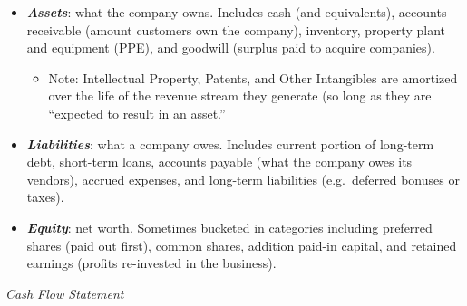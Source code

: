 \documentclass[
]{article}
\providecommand{\tightlist}{%
  \setlength{\itemsep}{0pt}\setlength{\parskip}{0pt}}
\begin{document}
\begin{itemize}
\item
  \textbf{\emph{Assets}}: what the company owns. Includes cash (and
  equivalents), accounts receivable (amount customers own the company),
  inventory, property plant and equipment (PPE), and goodwill (surplus
  paid to acquire companies).

  \begin{itemize}
  \tightlist
  \item
    Note: Intellectual Property, Patents, and Other Intangibles are
    amortized over the life of the revenue stream they generate (so long
    as they are ``expected to result in an asset.''
  \end{itemize}
\item
  \textbf{\emph{Liabilities}}: what a company owes. Includes current
  portion of long-term debt, short-term loans, accounts payable (what
  the company owes its vendors), accrued expenses, and long-term
  liabilities (e.g.~deferred bonuses or taxes).
\item
  \textbf{\emph{Equity}}: net worth. Sometimes bucketed in categories
  including preferred shares (paid out first), common shares, addition
  paid-in capital, and retained earnings (profits re-invested in the
  business).
\end{itemize}

\emph{Cash Flow Statement}
\end{document}
